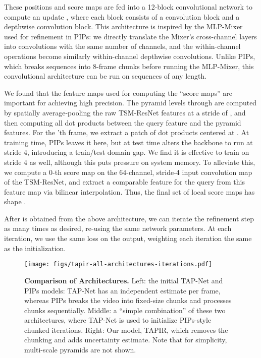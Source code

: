 \documentclass[10pt,twocolumn,letterpaper]{article}
\begin{document}
These positions and score maps are fed into a 12-block convolutional network to compute an update , where each block consists of a  convolution block and a depthwise convolution block.  This architecture is inspired by the
MLP-Mixer used for refinement in PIPs: we directly translate the Mixer's cross-channel layers into  convolutions with the same number of channels, and the within-channel operations become similarly within-channel depthwise convolutions.  Unlike PIPs, which breaks sequences into 8-frame chunks before running the MLP-Mixer, this convolutional architecture can be run on sequences of any length.  


We found that the feature maps used for computing the ``score maps'' are important for achieving high precision. The pyramid levels  through  are computed by spatially average-pooling the raw TSM-ResNet features  at a stride of , and then computing all dot products between the query feature  and the pyramid features.  For the 'th frame, we extract a  patch of dot products centered at .  At training time, PIPs leaves it here, but at test time alters the backbone to run at stride 4, introducing a train/test domain gap.  We find it is effective to train on stride 4 as well, although this puts pressure on system memory.  To alleviate this, we compute a 0-th score map on the 64-channel, stride-4 input convolution map of the TSM-ResNet, and extract a comparable feature for the query from this feature map via bilinear interpolation.  Thus, the final set of local score maps has shape . 

After  is obtained from the above architecture, we can iterate the refinement step as many times as desired, re-using the same network parameters.  At each iteration, we use the same loss  on the output, weighting each iteration the same as the initialization.

\begin{figure*}[t]
\begin{center}
\texttt{[image: figs/tapir-all-architectures-iterations.pdf]}
\end{center}
   \caption{\textbf{Comparison of Architectures.} Left: the initial TAP-Net and PIPs models: TAP-Net has an independent estimate per frame, whereas PIPs breaks the video into fixed-size chunks and processes chunks sequentially.  Middle: a ``simple combination'' of these two architectures, where TAP-Net is used to initialize PIPs-style chunked iterations.  Right: Our model, TAPIR, which removes the chunking and adds uncertainty estimate. Note that for simplicity, multi-scale pyramids are not shown.}
\label{fig:arch_compare}
\end{figure*}
\end{document}
